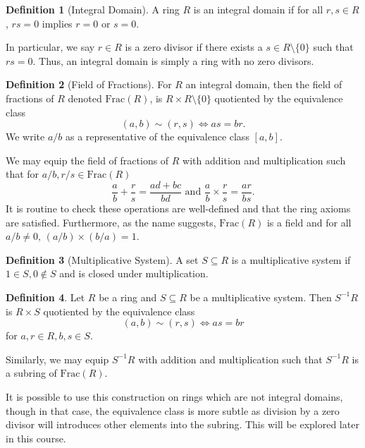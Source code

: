 \documentclass[]{article}
\theoremstyle{definition}
\theoremstyle{definition}
\newtheorem{definition}{Definition}[section]
\begin{document}
\begin{definition}[Integral Domain]
  A ring \(R\) is an integral domain if for all \(r, s \in R\), \(rs = 0\) 
  implies \(r = 0\) or \(s = 0\).
\end{definition}

In particular, we say \(r \in R\) is a zero divisor if there exists a 
\(s \in R \setminus \{0\}\) such that \(rs = 0\). Thus, an integral domain 
is simply a ring with no zero divisors. 

\begin{definition}[Field of Fractions]
  For \(R\) an integral domain, then the field of fractions of \(R\) denoted 
  \(\text{Frac}(R)\), is \(R \times R\setminus\{0\}\) quotiented by the 
  equivalence class 
  \[(a, b) \sim (r, s) \iff as = br.\]
  We write \(a / b\) as a representative of the equivalence class \([a, b]\).
\end{definition}

We may equip the field of fractions of \(R\) with addition and multiplication 
such that for \(a / b, r / s \in \text{Frac}(R)\) 
\[\frac{a}{b} + \frac{r}{s} = \frac{ad + bc}{bd} \text{ and } 
  \frac{a}{b} \times \frac{r}{s} = \frac{ar}{bs}.\]
It is routine to check these operations are well-defined and that the ring 
axioms are satisfied. Furthermore, as the name suggests, \(\text{Frac}(R)\) 
is a field and for all \(a / b \neq 0\), \((a / b) \times (b / a) = 1\).

\begin{definition}[Multiplicative System]
  A set \(S \subseteq R\) is a multiplicative system if \(1 \in S, 0 \notin S\) 
  and is closed under multiplication.
\end{definition}

\begin{definition}
  Let \(R\) be a ring and \(S \subseteq R\) be a multiplicative system. Then 
  \(S^{-1}R\) is \(R \times S\) quotiented by the equivalence class 
  \[(a, b) \sim (r, s) \iff as = br\]
  for \(a, r \in R, b, s \in S\).
\end{definition}

Similarly, we may equip \(S^{-1}R\) with addition and multiplication such that 
\(S^{-1}R\) is a subring of \(\text{Frac}(R)\). 

It is possible to use this construction on rings which are not integral domains, 
though in that case, the equivalence class is more subtle as division by a 
zero divisor will introduces other elements into the subring. This will be explored 
later in this course.
\end{document}

